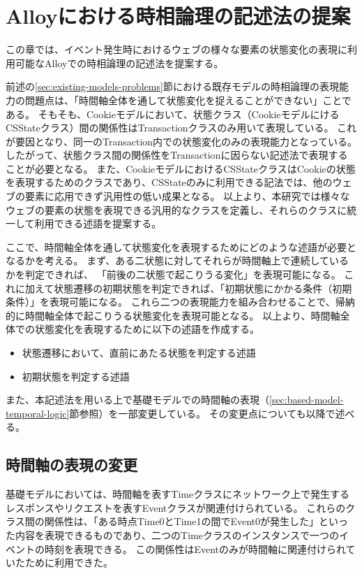 \documentclass[12pt,a4paper]{jbook}
\begin{document}
\newpage

\chapter{Alloyにおける時相論理の記述法の提案}
\label{sec:ProposedModel-TemporalLogic}
この章では、イベント発生時におけるウェブの様々な要素の状態変化の表現に利用可能なAlloyでの時相論理の記述法を提案する。

前述の\ref{sec:existing-models-problems}節における既存モデルの時相論理の表現能力の問題点は、「時間軸全体を通して状態変化を捉えることができない」ことである。
そもそも、Cookieモデルにおいて、状態クラス（CookieモデルにけるCSStateクラス）間の関係性はTransactionクラスのみ用いて表現している。
これが要因となり、同一のTransaction内での状態変化のみの表現能力となっている。
したがって、状態クラス間の関係性をTransactionに因らない記述法で表現することが必要となる。
また、CookieモデルにおけるCSStateクラスはCookieの状態を表現するためのクラスであり、CSStateのみに利用できる記法では、他のウェブの要素に応用できず汎用性の低い成果となる。
以上より、本研究では様々なウェブの要素の状態を表現できる汎用的なクラスを定義し、それらのクラスに統一して利用できる述語を提案する。

ここで、時間軸全体を通して状態変化を表現するためにどのような述語が必要となるかを考える。
まず、ある二状態に対してそれらが時間軸上で連続しているかを判定できれば、
「前後の二状態で起こりうる変化」を表現可能になる。
これに加えて状態遷移の初期状態を判定できれば、「初期状態にかかる条件（初期条件）」を表現可能になる。
これら二つの表現能力を組み合わせることで、帰納的に時間軸全体で起こりうる状態変化を表現可能となる。
以上より、時間軸全体での状態変化を表現するために以下の述語を作成する。
\begin{itemize}
\item 状態遷移において、直前にあたる状態を判定する述語
\item 初期状態を判定する述語
\end{itemize}

また、本記述法を用いる上で基礎モデルでの時間軸の表現（\ref{sec:based-model-temporal-logic}節参照）を一部変更している。
その変更点についても以降で述べる。

\section{時間軸の表現の変更}
基礎モデル\cite{based-model}においては、時間軸を表すTimeクラスにネットワーク上で発生するレスポンスやリクエストを表すEventクラスが関連付けられている。
これらのクラス間の関係性は、「ある時点Time0とTime1の間でEvent0が発生した」といった内容を表現できるものであり、二つのTimeクラスのインスタンスで一つのイベントの時刻を表現できる。
この関係性はEventのみが時間軸に関連付けられていたために利用できた。
\end{document}
